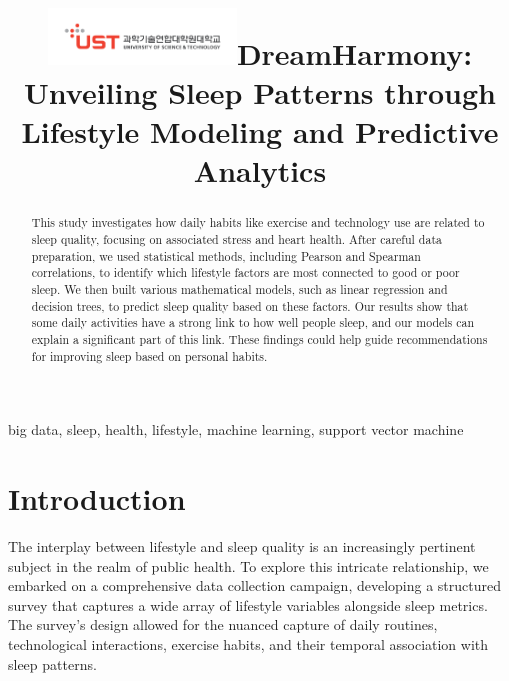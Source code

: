 \documentclass[conference]{IEEEtran}
\begin{document}

\title{\includegraphics[width=5cm]{images/ust.png}\linebreak DreamHarmony: Unveiling Sleep Patterns through Lifestyle Modeling and Predictive Analytics
}


\author{
}
\maketitle

\begin{abstract}
    This study investigates how daily habits like exercise and technology use are related to sleep quality, focusing on associated stress and heart health. After careful data preparation, we used statistical methods, including Pearson\cite{pearson} and Spearman correlations\cite{spearman}, to identify which lifestyle factors are most connected to good or poor sleep. We then built various mathematical models, such as linear regression and decision trees, to predict sleep quality based on these factors. Our results show that some daily activities have a strong link to how well people sleep, and our models can explain a significant part of this link. These findings could help guide recommendations for improving sleep based on personal habits.
\end{abstract}

\begin{IEEEkeywords}
    big data, sleep, health, lifestyle, machine learning, support vector machine
\end{IEEEkeywords}

\section{Introduction}
The interplay between lifestyle and sleep quality is an increasingly pertinent subject in the realm of public health. To explore this intricate relationship, we embarked on a comprehensive data collection campaign, developing a structured survey that captures a wide array of lifestyle variables alongside sleep metrics. The survey's design allowed for the nuanced capture of daily routines, technological interactions, exercise habits, and their temporal association with sleep patterns.
\end{document}
